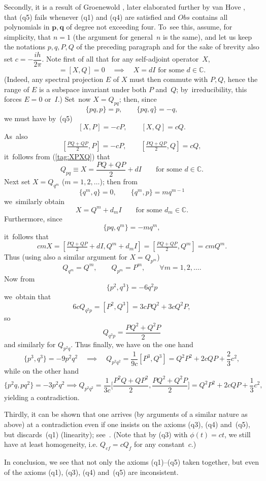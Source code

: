 \documentclass[11pt]{amsart}
\numberwithin{equation}{section}
\theoremstyle{remark}
\newcommand\Obs{Obs}
\newcommand{\CC}{\C}
\newcommand{\bp}{\mathbf p}
\newcommand{\bq}{\mathbf q}
\newcommand{\C}{\mathbb C}
\begin{document}
Secondly, it is a result of Groenewold \cite{bib:Groe}, later elaborated
further by van Hove \cite{bib:vHove}, that (q5) fails whenever (q1) and (q4)
are satisfied and $\Obs$ contains all polynomials in $\bp,\bq$ of degree not
exceeding four. To~see this, assume, for simplicity, that $n=1$ (the argument
for general~$n$ is the same), and let us keep the notations $p,q,P,Q$ of the
preceding paragraph and for the sake of brevity also set $c=-\dfrac{ih}{2\pi}$.
Note first of all that for any self-adjoint operator~$X$,
\begin{equation}  [X,P]=[X,Q]=0 \quad\implies\quad X=dI\text{ for some }
d\in\CC. \label{tag:XPXQ} \end{equation}
(Indeed, any spectral projection $E$ of $X$ must then commute with $P,Q$, hence
the range of $E$ is a subspace invariant under both $P$ and~$Q$;
by~irreducibility, this forces $E=0$ or~$I$.) Set~now $X=Q_{pq}$; then, since
$$ \{pq,p\}=p, \qquad \{pq,q\}=-q,  $$
we must have by~(q5)
$$ [X,P]=-cP, \qquad [X,Q]=cQ.  $$
As~also
$$ [ \tfrac{PQ+QP}2,P]=-cP, \qquad [\tfrac{PQ+QP}2,Q]=cQ,  $$
it~follows from (\ref{tag:XPXQ}) that
$$ Q_{pq} \equiv X = \frac{PQ+QP}2 + d I \qquad\text{for some }d\in\CC.  $$
Next set $X=Q_{q^m}$ ($m=1,2,\dots$); then from
$$ \{q^m,q\}=0, \qquad \{q^m,p\}=m q^{m-1}  $$
we~similarly obtain
$$ X=Q^m + d_m I \qquad\text{for some }d_m\in\CC.  $$
Furthermore, since
$$ \{pq,q^m\}= - m q^m,  $$
it~follows that
$$ cmX=[\tfrac{PQ+QP}2+dI,Q^m+d_m I] = [\tfrac{PQ+QP}2,Q^m] =cm Q^m.  $$
Thus (using also a similar argument for $X=Q_{p^m}$)
$$ Q_{q^m} = Q^m, \qquad Q_{p^m}=P^m, \qquad \forall m=1,2,\dots.  $$
Now from
$$ \{ p^2,q^3 \} = - 6q^2 p  $$
we~obtain that
$$ 6c Q_{q^2 p} = [P^2,Q^3] = 3c P Q^2+3c Q^2 P ,  $$
so
$$ Q_{q^2 p} = \frac{PQ^2+Q^2P}2  $$
and similarly for $Q_{p^2 q}$. Thus finally, we have on the one hand
$$ \{p^3,q^3\}=- 9p^2 q^2 \quad\implies\quad Q_{p^2 q^2} = \frac1{9c} [P^3,Q^3]
= Q^2 P^2 +2c QP + \frac23 c^2,  $$
while on the other hand
$$ \{p^2 q,p q^2\} = - 3 p^2 q^2 \implies Q_{p^2 q^2}= \frac1{3c}
\Big[\frac{P^2Q+QP^2}2,\frac{PQ^2+Q^2P}2\Big] = Q^2 P^2+2c QP+ \frac13c^2,  $$
yielding a contradiction.

Thirdly, it can be shown that one arrives (by arguments of a similar nature as
above) at a contradiction even if one insists on the axioms (q3), (q4)
and~(q5), but discards~(q1) (linearity); see~\cite{bib:ETuy}. (Note that
by (q3) with  $\phi(t)=c t$, we still have at least homogeneity, i.e. $Q_{cf}=c
Q_f$ for any constant~$c$.)

In conclusion, we  see that not only the axioms (q1)--(q5) taken together,
but even   of the axioms (q1), (q3), (q4)
and~(q5) are inconsistent.
\end{document}
